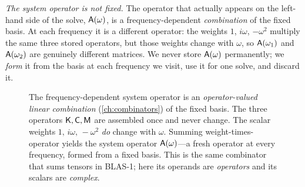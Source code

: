 \emph{The system operator is not fixed.} The operator that actually appears on the
left-hand side of the solve, $\mathsf{A}(\omega)$, is a frequency-dependent
\emph{combination} of the fixed basis. At each frequency it is a different
operator: the weights $1$, $i\omega$, $-\omega^2$ multiply the same three stored
operators, but those weights change with $\omega$, so $\mathsf{A}(\omega_1)$ and
$\mathsf{A}(\omega_2)$ are genuinely different matrices. We never store
$\mathsf{A}(\omega)$ permanently; we \emph{form} it from the basis at each frequency
we visit, use it for one solve, and discard it.

\begin{figure}[t]
\centering
{}
\caption[The system operator as an operator-valued linear combination]{The
frequency-dependent system operator is an \emph{operator-valued linear
combination} (\cref{ch:combinators}) of the fixed basis. The three operators
$\mathsf{K},\mathsf{C},\mathsf{M}$ are assembled once and never change. The scalar weights
$1,\,i\omega,\,-\omega^2$ \emph{do} change with $\omega$. Summing
weight-times-operator yields the system operator $\mathsf{A}(\omega)$---a fresh
operator at every frequency, formed from a fixed basis. This is the same
 combinator that sums tensors in BLAS-1; here its
operands are \emph{operators} and its scalars are \emph{complex}.}
\label{fig:opcombo}
\end{figure}

